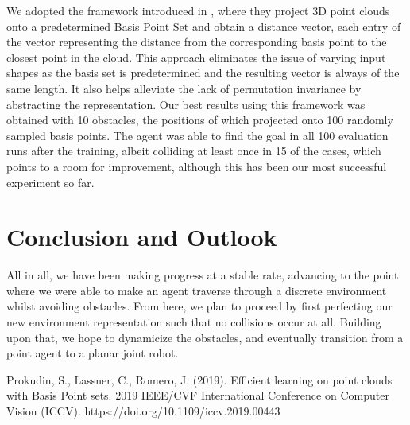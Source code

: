 \documentclass[conference]{IEEEtran}
\begin{document}
We adopted the framework introduced in \cite{b1}, where they project 3D point clouds onto a predetermined Basis Point Set and obtain a distance vector, each entry of the vector representing the distance from the corresponding basis point to the closest point in the cloud. This approach eliminates the issue of varying input shapes as the basis set is predetermined and the resulting vector is always of the same length. It also helps alleviate the lack of permutation invariance by abstracting the representation. 
Our best results using this framework was obtained with 10 obstacles, the positions of which projected onto 100 randomly sampled basis points. The agent was able to find the goal in all 100 evaluation runs after the training, albeit colliding at least once in 15 of the cases, which points to a room for improvement, although this has been our most successful experiment so far.

\section{Conclusion and Outlook} 

All in all, we have been making progress at a stable rate, advancing to the point where we were able to make an agent traverse through a discrete environment whilst avoiding obstacles. From here, we plan to proceed by first perfecting our new environment representation such that no collisions occur at all. Building upon that, we hope to dynamicize the obstacles, and eventually transition from a point agent to a planar joint robot.

\begin{thebibliography}{00}
 Prokudin, S., Lassner, C., Romero, J. (2019). Efficient learning on point clouds with Basis Point sets. 2019 IEEE/CVF International Conference on Computer Vision (ICCV). https://doi.org/10.1109/iccv.2019.00443 
\end{thebibliography}
\end{document}
